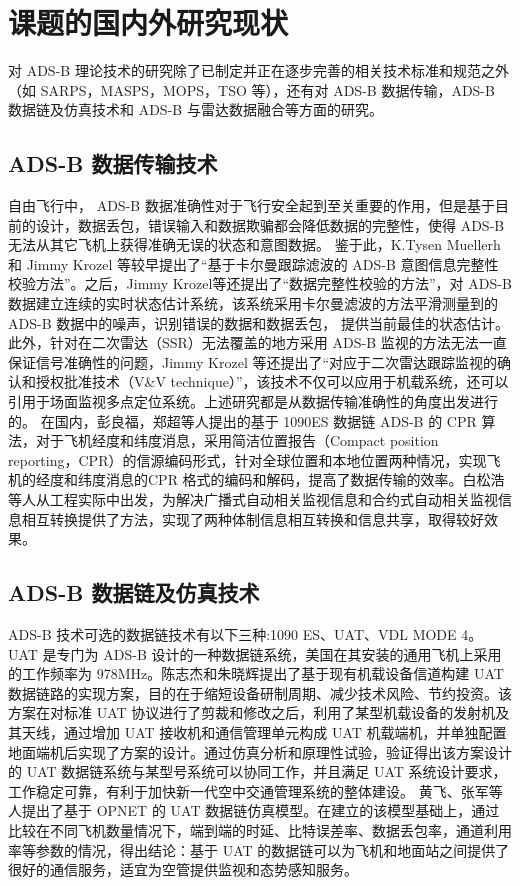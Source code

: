 \section{课题的国内外研究现状}
对 ADS-B 理论技术的研究除了已制定并正在逐步完善的相关技术标准和规范之外（如 SARPS，MASPS，MOPS，TSO 等），还有对 ADS-B 数据传输，ADS-B 数据链及仿真技术和 ADS-B 与雷达数据融合等方面的研究。
\subsection{ADS-B 数据传输技术} 
自由飞行中， ADS-B 数据准确性对于飞行安全起到至关重要的作用，但是基于目前的设计，数据丢包，错误输入和数据欺骗都会降低数据的完整性，使得 ADS-B 无法从其它飞机上获得准确无误的状态和意图数据。 鉴于此，K.Tysen Muellerh 和 Jimmy Krozel 等较早提出了“基于卡尔曼跟踪滤波的 ADS-B 意图信息完整性校验方法”\cite{mueller2000aircraft}。之后，Jimmy Krozel等还提出了“数据完整性校验的方法”，对 ADS-B 数据建立连续的实时状态估计系统，该系统采用卡尔曼滤波的方法平滑测量到的 ADS-B 数据中的噪声，识别错误的数据和数据丢包\cite{krozel2004aircraft}，
提供当前最佳的状态估计。此外，针对在二次雷达（SSR）无法覆盖的地方采用 ADS-B 监视的方法无法一直保证信号准确性的问题，Jimmy Krozel 等还提出了“对应于二次雷达跟踪监视的确认和授权批准技术（V&V technique）”\cite{krozel2005independent}，该技术不仅可以应用于机载系统，还可以引用于场面监视多点定位系统。上述研究都是从数据传输准确性的角度出发进行的。 在国内，彭良福，郑超等人提出的基于 1090ES 数据链 ADS-B 的 CPR 算法\cite{liu20151090es}，对于飞机经度和纬度消息，采用简洁位置报告（Compact position reporting，CPR）的信源编码形式，针对全球位置和本地位置两种情况，实现飞机的经度和纬度消息的CPR 格式的编码和解码，提高了数据传输的效率。白松浩等人从工程实际中出发，为解决广播式自动相关监视信息和合约式自动相关监视信息相互转换提供了方法，实现了两种体制信息相互转换和信息共享，取得较好效果\cite{bai2005guang}。
\subsection{ADS-B 数据链及仿真技术} 
ADS-B 技术可选的数据链技术有以下三种:1090 ES、UAT、VDL MODE 4。UAT 是专门为 ADS-B 设计的一种数据链系统，美国在其安装的通用飞机上采用的工作频率为 978MHz。陈志杰和朱晓辉提出了基于现有机载设备信道构建 UAT 数据链路的实现方案\cite{chen2008jiyu}，目的在于缩短设备研制周期、减少技术风险、节约投资。该方案在对标准 UAT 协议进行了剪裁和修改之后，利用了某型机载设备的发射机及其天线，通过增加 UAT 接收机和通信管理单元构成 UAT 机载端机，并单独配置地面端机后实现了方案的设计。通过仿真分析和原理性试验，验证得出该方案设计的 UAT 数据链系统与某型号系统可以协同工作，并且满足 UAT 系统设计要求，工作稳定可靠，有利于加快新一代空中交通管理系统的整体建设。 黄飞、张军等人提出了基于 OPNET 的 UAT 数据链仿真模型\cite{huang2008modeling}。在建立的该模型基础上，通过比较在不同飞机数量情况下，端到端的时延、比特误差率、数据丢包率，通道利用率等参数的情况，得出结论：基于 UAT 的数据链可以为飞机和地面站之间提供了很好的通信服务，适宜为空管提供监视和态势感知服务。
